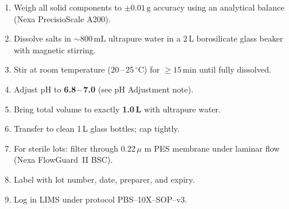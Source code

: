 \documentclass[10pt,a4paper]{article}
\begin{document}
\noindent
\begin{minipage}[t]{0.54\linewidth}
  \begin{tcolorbox}[tealbox, title={\faFlask\enskip Preparation Protocol}]
    \small\color{NexaText}
    \begin{enumerate}[leftmargin=5mm, itemsep=2pt, topsep=1pt, label=\textbf{\arabic*.}]
      \item Weigh all solid components to $\pm0.01\,\text{g}$ accuracy using an
            analytical balance (Nexa PrecisioScale A200).
      \item Dissolve salts in $\sim\!800\,\text{mL}$ ultrapure water in a
            2\,L borosilicate glass beaker with magnetic stirring.
      \item Stir at room temperature (20\,--\,25\,$^{\circ}$C) for
            $\geq 15\,\text{min}$ until fully dissolved.
      \item Adjust pH to \textbf{6.8\,--\,7.0} (see pH Adjustment note).
      \item Bring total volume to exactly \textbf{1.0\,L} with ultrapure water.
      \item Transfer to clean 1\,L glass bottles; cap tightly.
      \item For sterile lots: filter through 0.22\,\ensuremath{\mu} m PES membrane
            under laminar flow (Nexa FlowGuard~II BSC).
      \item Label with lot number, date, preparer, and expiry.
      \item Log in LIMS under protocol PBS--10X--SOP--v3.
    \end{enumerate}
  \end{tcolorbox}
\end{minipage}%
\hfill
\end{document}
